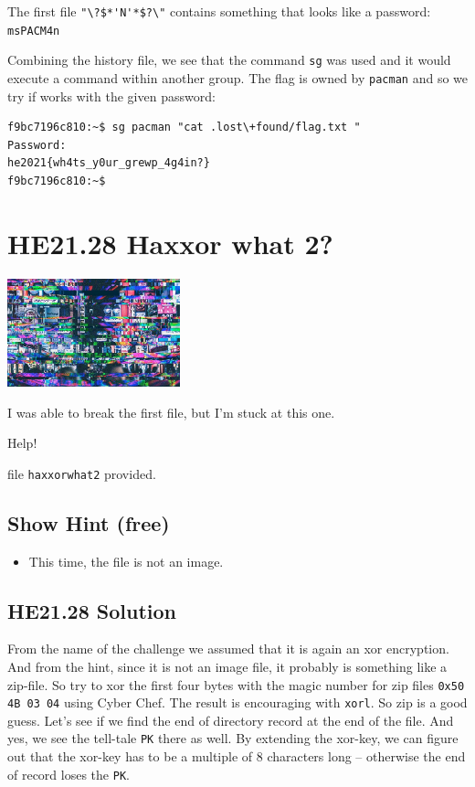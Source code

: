 \documentclass[english,a4paper,nols,noindent]{tufte-handout}
\begin{document}
The first file \verb+"\?$*'N'*$?\"+ contains something that looks like a
password: \verb+msPACM4n+

Combining the history file, we see that the command \verb+sg+ was used and it
would execute a command within another group.  The flag is owned by
\verb+pacman+ and so we try if works with the given password:

\begin{verbatim} 
f9bc7196c810:~$ sg pacman "cat .lost\+found/flag.txt "
Password:
he2021{wh4ts_y0ur_grewp_4g4in?}
f9bc7196c810:~$
\end{verbatim} 

\hypertarget{he21.28}{%
  \section{HE21.28 Haxxor what 2?}
  \label{he21.28}}
\begin{marginfigure}
    \includegraphics[width=50mm]{images/challenge28.jpg}
\end{marginfigure}

\noindent I was able to break the first file, but I'm stuck at this one.

Help!

file \verb+haxxorwhat2+ provided.

\subsection{Show Hint (free)}
\begin{itemize}
\item This time, the file is not an image.
\end{itemize}

\hypertarget{he21.28-solution}{%
\subsection{HE21.28 Solution}\label{he21.28-solution}}

\noindent From the name of the challenge we assumed that it is again an xor
encryption.  And from the hint, since it is not an image file, it probably is
something like a zip-file.  So try to xor the first four bytes with the magic
number for zip files \verb+0x50 4B 03 04+ using Cyber Chef.  The result is
encouraging with \verb+xorl+.  So zip is a good guess.  Let's see if we find
the end of directory record at the end of the file.  And yes, we see the
tell-tale \verb+PK+ there as well.  By extending the xor-key, we can figure out
that the xor-key has to be a multiple of 8 characters long -- otherwise the end
of record loses the \verb+PK+.
\end{document}
